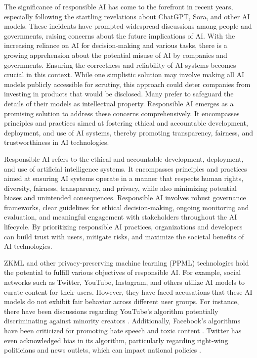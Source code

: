 \documentclass[conference]{IEEEtran}
\begin{document}
The significance of responsible AI has come to the forefront in recent years, especially following the startling revelations about ChatGPT, Sora, and other AI models. These incidents have prompted widespread discussions among people and governments, raising concerns about the future implications of AI. With the increasing reliance on AI for decision-making and various tasks, there is a growing apprehension about the potential misuse of AI by companies and governments. Ensuring the correctness and reliability of AI systems becomes crucial in this context. While one simplistic solution may involve making all AI models publicly accessible for scrutiny, this approach could deter companies from investing in products that would be disclosed. Many prefer to safeguard the details of their models as intellectual property. Responsible AI emerges as a promising solution to address these concerns comprehensively. It encompasses principles and practices aimed at fostering ethical and accountable development, deployment, and use of AI systems, thereby promoting transparency, fairness, and trustworthiness in AI technologies.

Responsible AI refers to the ethical and accountable development, deployment, and use of artificial intelligence systems. It encompasses principles and practices aimed at ensuring AI systems operate in a manner that respects human rights, diversity, fairness, transparency, and privacy, while also minimizing potential biases and unintended consequences. Responsible AI involves robust governance frameworks, clear guidelines for ethical decision-making, ongoing monitoring and evaluation, and meaningful engagement with stakeholders throughout the AI lifecycle. By prioritizing responsible AI practices, organizations and developers can build trust with users, mitigate risks, and maximize the societal benefits of AI technologies.

ZKML and other privacy-preserving machine learning (PPML) technologies hold the potential to fulfill various objectives of responsible AI. For example, social networks such as Twitter, YouTube, Instagram, and others utilize AI models to curate content for their users. However, they have faced accusations that these AI models do not exhibit fair behavior across different user groups. For instance, there have been discussions regarding YouTube's algorithm potentially discriminating against minority creators . Additionally, Facebook's algorithms have been criticized for promoting hate speech and toxic content . Twitter has even acknowledged bias in its algorithm, particularly regarding right-wing politicians and news outlets, which can impact national policies .
\end{document}

